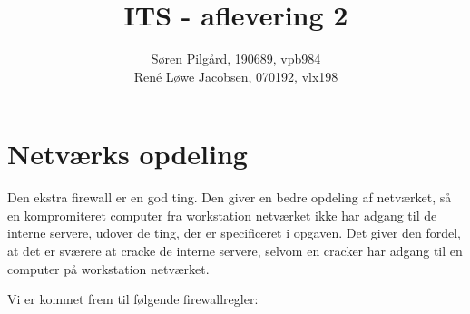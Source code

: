 \documentclass[10pt,a4paper,danish]{article}
\title{ITS - aflevering 2}
\author{Søren Pilgård, 190689, vpb984\\
  René Løwe Jacobsen, 070192, vlx198}
\begin{document}
\maketitle
\newpage

\tableofcontents
\newpage

\section{Netværks opdeling}
Den ekstra firewall er en god ting. Den giver en bedre opdeling af netværket, så
en kompromiteret computer fra workstation netværket ikke har adgang til de
interne servere, udover de ting, der er specificeret i opgaven.
Det giver den fordel, at det er sværere at cracke de interne servere,
selvom en cracker har adgang til en computer på workstation netværket.

Vi er kommet frem til følgende firewallregler:
\end{document}
